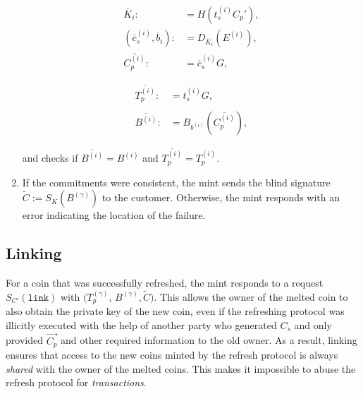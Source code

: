 \documentclass{llncs}
\begin{document}
\begin{enumerate}
    \vspace{-2ex}
    \begin{minipage}{5cm}
    \begin{align*}
      \overline{K}_i :&= H(t_s^{(i)} C_p'), \\
      (\overline{c}_s^{(i)}, \overline{b}_i) :&= D_{\overline{K}_i}(E^{(i)}), \\
     \overline{C^{(i)}_p} :&= \overline{c}_s^{(i)} G,
     \end{align*}
     \end{minipage}
    \begin{minipage}{5cm}
      \begin{align*}
       \overline{T_p^{(i)}} :&= t_s^{(i)} G, \\ \\
      \overline{B^{(i)}} :&= B_{b^{(i)}}(\overline{C_p^{(i)}}),
      \end{align*}
    \end{minipage}

    and checks if $\overline{B^{(i)}} = B^{(i)}$
    and $\overline{T^{(i)}_p} = T^{(i)}_p$.

  \item \label{step:refresh-done} If the commitments were consistent,
    the mint sends the blind signature $\widetilde{C} :=
    S_{K}(B^{(\gamma)})$ to the customer.  Otherwise, the mint responds
    with an error indicating the location of the failure.
\end{enumerate}

%

\subsection{Linking}

For a coin that was successfully refreshed, the mint responds to a
request $S_{C'}(\mathtt{link})$ with $(T^{(\gamma)}_p$, $B^{(\gamma)},
\widetilde{C})$.
%
This allows the owner of the melted coin to also obtain the private
key of the new coin, even if the refreshing protocol was illicitly
executed with the help of another party who generated $C_s$ and only
provided $\vec{C_p}$ and other required information to the old owner.
As a result, linking ensures that access to the new coins minted by
the refresh protocol is always {\em shared} with the owner of the
melted coins.  This makes it impossible to abuse the refresh protocol
for {\em transactions}.
\end{document}
